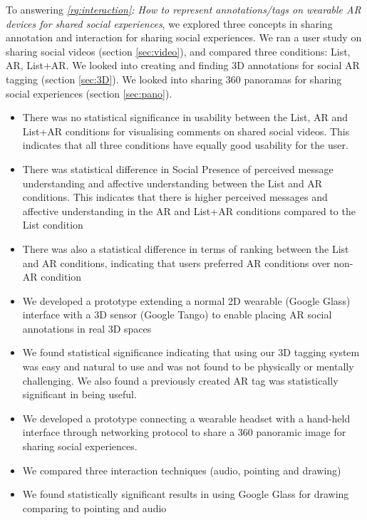 To answering \textit{\ref{rq:interaction}: How to represent annotations/tags on wearable AR devices for shared social experiences}, we explored three concepts in sharing annotation and interaction for sharing social experiences. We ran a user study on sharing social videos (section \ref{sec:video}), and compared three conditions: List, AR, List+AR. We looked into creating and finding 3D annotations for social AR tagging (section \ref{sec:3D}). We looked into sharing 360 panoramas for sharing social experiences (section \ref{sec:pano}). 

\begin{itemize}
    \item{There was no statistical significance in usability between the List, AR and List+AR conditions for visualising comments on shared social videos. This indicates that all three conditions have equally good usability for the user.}
    \item{There was statistical difference in Social Presence of perceived message understanding and affective understanding between the List and AR conditions. This indicates that there is higher perceived messages and affective understanding in the AR and List+AR conditions compared to the List condition}
    \item{There was also a statistical difference in terms of ranking between the List and AR conditions, indicating that users preferred AR conditions over non-AR condition}
    \item{We developed a prototype extending a normal 2D wearable (Google Glass) interface with a 3D sensor (Google Tango) to enable placing AR social annotations in real 3D spaces}
    \item{We found statistical significance indicating that using our 3D tagging system was easy and natural to use and was not found to be physically or mentally challenging. We also found a previously created AR tag was statistically significant in being useful.}
    \item{We developed a prototype connecting a wearable headset with a hand-held interface through networking protocol to share a 360 panoramic image for sharing social experiences.}
    \item{We compared three interaction techniques (audio, pointing and drawing)}
    \item{We found statistically significant results in using Google Glass for drawing comparing to pointing and audio}
\end{itemize}

